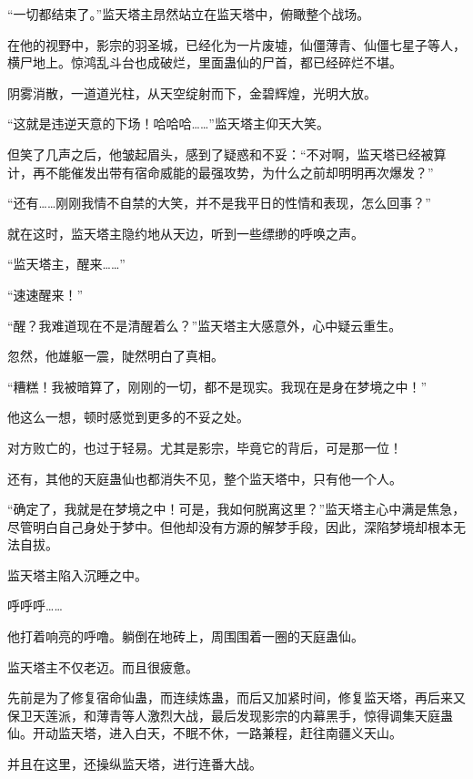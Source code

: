 
\begin{this_body}

“一切都结束了。”监天塔主昂然站立在监天塔中，俯瞰整个战场。

在他的视野中，影宗的羽圣城，已经化为一片废墟，仙僵薄青、仙僵七星子等人，横尸地上。惊鸿乱斗台也成破烂，里面蛊仙的尸首，都已经碎烂不堪。

阴雾消散，一道道光柱，从天空绽射而下，金碧辉煌，光明大放。

“这就是违逆天意的下场！哈哈哈……”监天塔主仰天大笑。

但笑了几声之后，他皱起眉头，感到了疑惑和不妥：“不对啊，监天塔已经被算计，再不能催发出带有宿命威能的最强攻势，为什么之前却明明再次爆发？”

“还有……刚刚我情不自禁的大笑，并不是我平日的性情和表现，怎么回事？”

就在这时，监天塔主隐约地从天边，听到一些缥缈的呼唤之声。

“监天塔主，醒来……”

“速速醒来！”

“醒？我难道现在不是清醒着么？”监天塔主大感意外，心中疑云重生。

忽然，他雄躯一震，陡然明白了真相。

“糟糕！我被暗算了，刚刚的一切，都不是现实。我现在是身在梦境之中！”

他这么一想，顿时感觉到更多的不妥之处。

对方败亡的，也过于轻易。尤其是影宗，毕竟它的背后，可是那一位！

还有，其他的天庭蛊仙也都消失不见，整个监天塔中，只有他一个人。

“确定了，我就是在梦境之中！可是，我如何脱离这里？”监天塔主心中满是焦急，尽管明白自己身处于梦中。但他却没有方源的解梦手段，因此，深陷梦境却根本无法自拔。

监天塔主陷入沉睡之中。

呼呼呼……

他打着响亮的呼噜。躺倒在地砖上，周围围着一圈的天庭蛊仙。

监天塔主不仅老迈。而且很疲惫。

先前是为了修复宿命仙蛊，而连续炼蛊，而后又加紧时间，修复监天塔，再后来又保卫天莲派，和薄青等人激烈大战，最后发现影宗的内幕黑手，惊得调集天庭蛊仙。开动监天塔，进入白天，不眠不休，一路兼程，赶往南疆义天山。

并且在这里，还操纵监天塔，进行连番大战。


\end{this_body}
